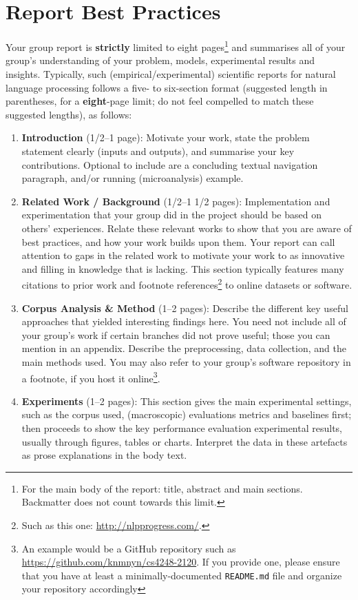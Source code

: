 \documentclass[11pt]{article}
\begin{document}
\section{Report Best Practices}
\label{s:best}

Your group report is {\bf strictly} limited to eight pages\footnote{For the main body of the report: title, abstract and main sections. Backmatter does not count towards this limit.} and summarises all of your group's understanding of your problem, models, experimental results and insights.  Typically, such (empirical/experimental) scientific reports for natural language processing follows a five- to six-section format ({}suggested length in parentheses, for a {\bf eight}-page limit; do not feel compelled to match these suggested lengths), as follows:

\begin{enumerate}
    \item {\bf Introduction} (1/2--1 page): Motivate your work, state the problem statement clearly (inputs and outputs), and summarise your key contributions.  Optional to include are a concluding textual navigation paragraph, and/or running (microanalysis) example. 
    \item {\bf Related Work / Background} (1/2--1 1/2 pages): Implementation and experimentation that your group did in the project should be based on others' experiences.  Relate these relevant works to show that you are aware of best practices, and how your work builds upon them.  Your report can call attention to gaps in the related work to motivate your work to as innovative and filling in knowledge that is lacking.  This section typically features many citations to prior work and footnote references\footnote{Such as this one: \url{http://nlpprogress.com/}.} to online datasets or software.
    \item {\bf Corpus Analysis \& Method} (1--2 pages): Describe the different key useful approaches that yielded interesting findings here.  You need not include all of your group's work if certain branches did not prove useful; those you can mention in an appendix.  Describe the preprocessing, data collection, and the main methods used. You may also refer to your group's software repository in a footnote, if you host it online\footnote{An example would be a GitHub repository such as \url{https://github.com/knmnyn/cs4248-2120}. If you provide one, please ensure that you have at least a minimally-documented {\tt README.md} file and organize your repository accordingly}. 
    \item {\bf Experiments} (1--2 pages): This section gives the main experimental settings, such as the corpus used, (macroscopic) evaluations metrics and baselines first; then proceeds to show the key performance evaluation experimental results, usually through figures, tables or charts.  Interpret the data in these artefacts as prose explanations in the body text.

\end{enumerate}
\end{document}
